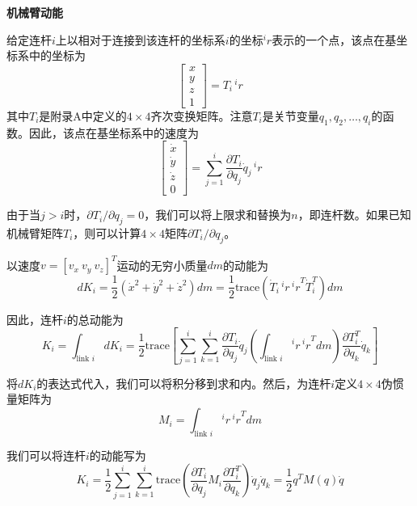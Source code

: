 \documentclass[12pt,a4paper]{ctexart}
\begin{document}
\textbf{机械臂动能}

给定连杆$i$上以相对于连接到该连杆的坐标系$i$的坐标$^ir$表示的一个点，该点在基坐标系中的坐标为
\begin{equation}
\begin{bmatrix} x \\ y \\ z \\ 1 \end{bmatrix} = T_i \, {^ir}
\end{equation}
其中$T_i$是附录A中定义的$4 \times 4$齐次变换矩阵。注意$T_i$是关节变量$q_1, q_2, \ldots, q_i$的函数。因此，该点在基坐标系中的速度为
\begin{equation}
\begin{bmatrix} \dot{x} \\ \dot{y} \\ \dot{z} \\ 0 \end{bmatrix} = \sum_{j=1}^{i} \frac{\partial T_i}{\partial q_j}\dot{q}_j \, {^ir}
\end{equation}

由于当$j > i$时，$\partial T_i/\partial q_j = 0$，我们可以将上限求和替换为$n$，即连杆数。如果已知机械臂矩阵$T_i$，则可以计算$4 \times 4$矩阵$\partial T_i/\partial q_j$。

以速度$v = [v_x \ v_y \ v_z]^T$运动的无穷小质量$dm$的动能为
\begin{equation}
dK_i = \frac{1}{2}(\dot{x}^2 + \dot{y}^2 + \dot{z}^2)dm = \frac{1}{2}\text{trace}(\dot{T}_i \, {^ir} \, {^ir}^T \dot{T}_i^T)dm
\end{equation}

因此，连杆$i$的总动能为
\begin{equation}
K_i = \int_{\text{link }i} dK_i = \frac{1}{2}\text{trace}\left[\sum_{j=1}^{i}\sum_{k=1}^{i}\frac{\partial T_i}{\partial q_j}\dot{q}_j\left(\int_{\text{link }i}{^ir} \, {^ir}^T dm\right)\frac{\partial T_i^T}{\partial q_k}\dot{q}_k\right]
\end{equation}

将$dK_i$的表达式代入，我们可以将积分移到求和内。然后，为连杆$i$定义$4 \times 4$伪惯量矩阵为
\begin{equation}
M_i = \int_{\text{link }i}{^ir} \, {^ir}^T dm
\end{equation}

我们可以将连杆$i$的动能写为
\begin{equation}
K_i = \frac{1}{2}\sum_{j=1}^{i}\sum_{k=1}^{i}\text{trace}\left(\frac{\partial T_i}{\partial q_j}M_i\frac{\partial T_i^T}{\partial q_k}\right)\dot{q}_j\dot{q}_k = \frac{1}{2}q^T M(q) \dot{q}
\end{equation}
\end{document}
